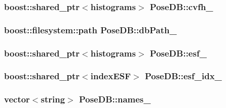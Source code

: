 \hypertarget{classPoseDB_a64f15c76d07faed58d44fa73fe8081f2}{
\subsubsection[{cvfh\-\_\-}]{\setlength{\rightskip}{0pt plus 5cm}boost\-::shared\-\_\-ptr$<${\bf histograms}$>$ Pose\-D\-B\-::cvfh\-\_\-\hspace{0.3cm}{\ttfamily [private]}}}\label{classPoseDB_a64f15c76d07faed58d44fa73fe8081f2}
\hypertarget{classPoseDB_ad1e3c1001be37bde48faa6502370494b}{
\subsubsection[{db\-Path\-\_\-}]{\setlength{\rightskip}{0pt plus 5cm}boost\-::filesystem\-::path Pose\-D\-B\-::db\-Path\-\_\-\hspace{0.3cm}{\ttfamily [private]}}}\label{classPoseDB_ad1e3c1001be37bde48faa6502370494b}
\hypertarget{classPoseDB_a658d2785a7e8f59466993864addbeb20}{
\subsubsection[{esf\-\_\-}]{\setlength{\rightskip}{0pt plus 5cm}boost\-::shared\-\_\-ptr$<${\bf histograms}$>$ Pose\-D\-B\-::esf\-\_\-\hspace{0.3cm}{\ttfamily [private]}}}\label{classPoseDB_a658d2785a7e8f59466993864addbeb20}
\hypertarget{classPoseDB_ae19c149b38112855a937364747edefd5}{
\subsubsection[{esf\-\_\-idx\-\_\-}]{\setlength{\rightskip}{0pt plus 5cm}boost\-::shared\-\_\-ptr$<${\bf index\-E\-S\-F}$>$ Pose\-D\-B\-::esf\-\_\-idx\-\_\-\hspace{0.3cm}{\ttfamily [private]}}}\label{classPoseDB_ae19c149b38112855a937364747edefd5}
\hypertarget{classPoseDB_a2870a93aa6304528109ce29204c95f51}{
\subsubsection[{names\-\_\-}]{\setlength{\rightskip}{0pt plus 5cm}vector$<$string$>$ Pose\-D\-B\-::names\-\_\-\hspace{0.3cm}{\ttfamily [private]}}}\label{classPoseDB_a2870a93aa6304528109ce29204c95f51}
